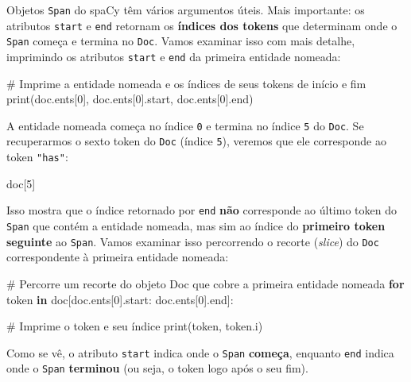 \documentclass[
  brazilian,
  11pt,
]{article}
\newenvironment{Shaded}{\begin{snugshade}}{\end{snugshade}}
\newcommand{\BuiltInTok}[1]{\textcolor[rgb]{0.50,0.55,0.55}{#1}}
\newcommand{\CommentTok}[1]{\textcolor[rgb]{0.48,0.49,0.49}{#1}}
\newcommand{\ControlFlowTok}[1]{\textcolor[rgb]{0.99,0.74,0.29}{\textbf{#1}}}
\newcommand{\DecValTok}[1]{\textcolor[rgb]{0.96,0.45,0.00}{#1}}
\newcommand{\KeywordTok}[1]{\textcolor[rgb]{0.81,0.81,0.76}{\textbf{#1}}}
\newcommand{\NormalTok}[1]{\textcolor[rgb]{0.81,0.81,0.76}{#1}}
\let\oldtexttt\texttt
\renewcommand{\texttt}[1]{{\color{inlink}\oldtexttt{#1}}}
\begin{document}
Objetos \texttt{Span} do spaCy têm vários argumentos úteis. Mais
importante: os atributos \texttt{start} e \texttt{end} retornam os
\textbf{índices dos tokens} que determinam onde o \texttt{Span} começa e
termina no \texttt{Doc}. Vamos examinar isso com mais detalhe,
imprimindo os atributos \texttt{start} e \texttt{end} da primeira
entidade nomeada:

\begin{Shaded}
\begin{Highlighting}[]
\CommentTok{\# Imprime a entidade nomeada e os índices de seus tokens de início e fim}
\BuiltInTok{print}\NormalTok{(doc.ents[}\DecValTok{0}\NormalTok{], doc.ents[}\DecValTok{0}\NormalTok{].start, doc.ents[}\DecValTok{0}\NormalTok{].end)}
\end{Highlighting}
\end{Shaded}

A entidade nomeada começa no índice \texttt{0} e termina no índice
\texttt{5} do \texttt{Doc}. Se recuperarmos o sexto token do
\texttt{Doc} (índice \texttt{5}), veremos que ele corresponde ao token
\texttt{"has"}:

\begin{Shaded}
\begin{Highlighting}[]
\NormalTok{doc[}\DecValTok{5}\NormalTok{]}
\end{Highlighting}
\end{Shaded}

Isso mostra que o índice retornado por \texttt{end} \textbf{não}
corresponde ao último token do \texttt{Span} que contém a entidade
nomeada, mas sim ao índice do \textbf{primeiro token seguinte} ao
\texttt{Span}. Vamos examinar isso percorrendo o recorte (\emph{slice})
do \texttt{Doc} correspondente à primeira entidade nomeada:

\begin{Shaded}
\begin{Highlighting}[]
\CommentTok{\# Percorre um recorte do objeto Doc que cobre a primeira entidade nomeada}
\ControlFlowTok{for}\NormalTok{ token }\KeywordTok{in}\NormalTok{ doc[doc.ents[}\DecValTok{0}\NormalTok{].start: doc.ents[}\DecValTok{0}\NormalTok{].end]:}

    \CommentTok{\# Imprime o token e seu índice}
    \BuiltInTok{print}\NormalTok{(token, token.i)}
\end{Highlighting}
\end{Shaded}

Como se vê, o atributo \texttt{start} indica onde o \texttt{Span}
\textbf{começa}, enquanto \texttt{end} indica onde o \texttt{Span}
\textbf{terminou} (ou seja, o token logo após o seu fim).
\end{document}
